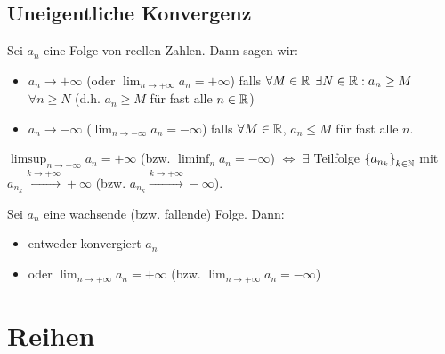 \subsection{Uneigentliche Konvergenz}
\begin{Def}
  Sei $a_n$ eine Folge von reellen Zahlen. Dann sagen wir:
  \begin{itemize}
    \item $a_n\to +\infty$ (oder $\lim_{n\to +\infty} a_n=+\infty$) falls $\forall M\in\mathbb{R}$ $\exists N\in\mathbb{R}:a_n\geq M$ $\forall n\geq N$ 
(d.h. $a_n\geq M$ für fast alle $n\in\mathbb{R}$)
    \item $a_n\to-\infty$ ($\lim_{n\to -\infty} a_n=-\infty$) 
falls $\forall M\in\mathbb{R}$, $a_n\leq M$ für fast alle $n$.
  \end{itemize}
\end{Def}
\begin{Ueb}
$\limsup_{n\to+\infty}a_n=+\infty$ (bzw. $\liminf_n a_n = -\infty$)
$\iff$ $\exists$ Teilfolge 
$\left\{ a_{n_k} \right\}_{k\in\mathbb{N}}$ mit 
$a_{n_k}\stackrel{k\to+\infty}{\to}+\infty$ (bzw. 
$a_{n_k}\stackrel{k\to+\infty}{\to}-\infty$).
\end{Ueb}
\begin{Bem}
  Sei $a_n$ eine wachsende (bzw. fallende) Folge. Dann:
  \begin{itemize}
    \item entweder konvergiert $a_n$
    \item oder $\lim_{n\to+\infty}a_n=+\infty$ (bzw. $\lim_{n\to+\infty}a_n=-\infty$)
  \end{itemize}
\end{Bem}
\section{Reihen}
